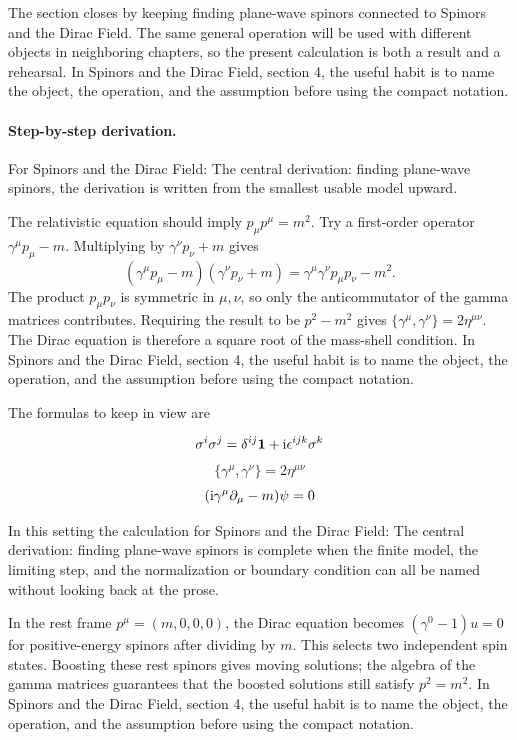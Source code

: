 The section closes by keeping finding plane-wave spinors connected to Spinors and the Dirac Field.  The same general operation will be used with different objects in neighboring chapters, so the present calculation is both a result and a rehearsal.  In Spinors and the Dirac Field, section 4, the useful habit is to name the object, the operation, and the assumption before using the compact notation.



\paragraph{Step-by-step derivation.}

For Spinors and the Dirac Field: The central derivation: finding plane-wave spinors, the derivation is written from the smallest usable model upward.

The relativistic equation should imply \(p_\mu p^\mu=m^2\).  Try a first-order operator \(\gamma^\mu p_\mu-m\).  Multiplying by \(\gamma^\nu p_\nu+m\) gives
\[
  (\gamma^\mu p_\mu-m)(\gamma^\nu p_\nu+m)
  =
  \gamma^\mu\gamma^\nu p_\mu p_\nu-m^2.
\]
The product \(p_\mu p_\nu\) is symmetric in \(\mu,\nu\), so only the anticommutator of the gamma matrices contributes.  Requiring the result to be \(p^2-m^2\) gives \(\{\gamma^\mu,\gamma^\nu\}=2\eta^{\mu\nu}\).  The Dirac equation is therefore a square root of the mass-shell condition.  In Spinors and the Dirac Field, section 4, the useful habit is to name the object, the operation, and the assumption before using the compact notation.

The formulas to keep in view are

\[
  \sigma^i\sigma^j=\delta^{ij}\mathbf 1+\mathrm i\epsilon^{ijk}\sigma^k
\]
\[
  \{\gamma^\mu,\gamma^\nu\}=2\eta^{\mu\nu}
\]
\[
  (\mathrm i\gamma^\mu\partial_\mu-m)\psi=0
\]

In this setting the calculation for Spinors and the Dirac Field: The central derivation: finding plane-wave spinors is complete when the finite model, the limiting step, and the normalization or boundary condition can all be named without looking back at the prose.




\begin{example}
In the rest frame \(p^\mu=(m,0,0,0)\), the Dirac equation becomes \((\gamma^0-1)u=0\) for positive-energy spinors after dividing by \(m\).  This selects two independent spin states.  Boosting these rest spinors gives moving solutions; the algebra of the gamma matrices guarantees that the boosted solutions still satisfy \(p^2=m^2\).  In Spinors and the Dirac Field, section 4, the useful habit is to name the object, the operation, and the assumption before using the compact notation.
\end{example}



